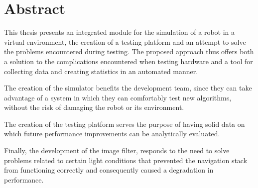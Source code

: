 \documentclass{Configuration_Files/PoliMi3i_thesis}
\begin{document}


\pagestyle{empty} %
\frontmatter %


\startpreamble
\setcounter{page}{1} %

\chapter*{Abstract} 
This thesis presents an integrated module for the simulation of a robot in a virtual environment, the creation of a testing platform and an attempt to solve the problems encountered during testing. 
The proposed approach thus offers both a solution to the complications encountered when testing hardware and a tool for collecting data and creating statistics in an automated manner.

The creation of the simulator benefits the development team, since they can take advantage of a system in which they can comfortably test new algorithms, without the risk of damaging the robot or its environment.

The creation of the testing platform serves the purpose of having solid data on which future performance improvements can be analytically evaluated.

Finally, the development of the image filter, responds to the need to solve problems related to certain light conditions that prevented the navigation stack from functioning correctly and consequently caused a degradation in performance.
\end{document}
